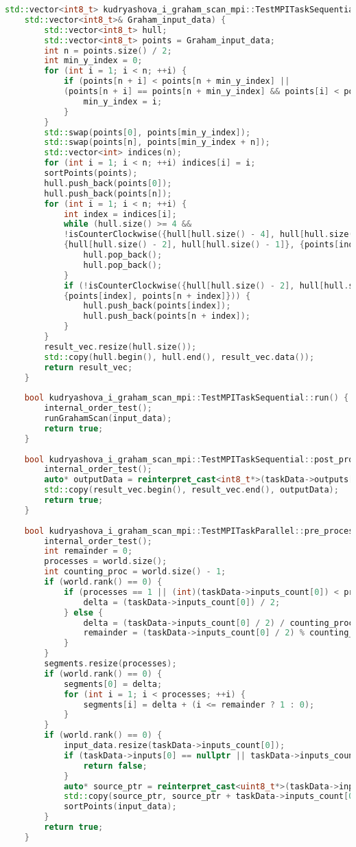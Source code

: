 \documentclass[a4paper,12pt]{article}
\begin{document}
\begin{lstlisting}[language=C++]
	std::vector<int8_t> kudryashova_i_graham_scan_mpi::TestMPITaskSequential::runGrahamScan(
	std::vector<int8_t>& Graham_input_data) {
		std::vector<int8_t> hull;
		std::vector<int8_t> points = Graham_input_data;
		int n = points.size() / 2;
		int min_y_index = 0;
		for (int i = 1; i < n; ++i) {
			if (points[n + i] < points[n + min_y_index] ||
			(points[n + i] == points[n + min_y_index] && points[i] < points[min_y_index])) {
				min_y_index = i;
			}
		}
		std::swap(points[0], points[min_y_index]);
		std::swap(points[n], points[min_y_index + n]);
		std::vector<int> indices(n);
		for (int i = 1; i < n; ++i) indices[i] = i;
		sortPoints(points);
		hull.push_back(points[0]);
		hull.push_back(points[n]);
		for (int i = 1; i < n; ++i) {
			int index = indices[i];
			while (hull.size() >= 4 &&
			!isCounterClockwise({hull[hull.size() - 4], hull[hull.size() - 3]},
			{hull[hull.size() - 2], hull[hull.size() - 1]}, {points[index], points[n + index]})) {
				hull.pop_back();
				hull.pop_back();
			}
			if (!isCounterClockwise({hull[hull.size() - 2], hull[hull.size() - 1]}, {points[index], points[n + index]},
			{points[index], points[n + index]})) {
				hull.push_back(points[index]);
				hull.push_back(points[n + index]);
			}
		}
		result_vec.resize(hull.size());
		std::copy(hull.begin(), hull.end(), result_vec.data());
		return result_vec;
	}
	
	bool kudryashova_i_graham_scan_mpi::TestMPITaskSequential::run() {
		internal_order_test();
		runGrahamScan(input_data);
		return true;
	}
	
	bool kudryashova_i_graham_scan_mpi::TestMPITaskSequential::post_processing() {
		internal_order_test();
		auto* outputData = reinterpret_cast<int8_t*>(taskData->outputs[0]);
		std::copy(result_vec.begin(), result_vec.end(), outputData);
		return true;
	}
	
	bool kudryashova_i_graham_scan_mpi::TestMPITaskParallel::pre_processing() {
		internal_order_test();
		int remainder = 0;
		processes = world.size();
		int counting_proc = world.size() - 1;
		if (world.rank() == 0) {
			if (processes == 1 || (int)(taskData->inputs_count[0]) < processes) {
				delta = (taskData->inputs_count[0]) / 2;
			} else {
				delta = (taskData->inputs_count[0] / 2) / counting_proc;
				remainder = (taskData->inputs_count[0] / 2) % counting_proc;
			}
		}
		segments.resize(processes);
		if (world.rank() == 0) {
			segments[0] = delta;
			for (int i = 1; i < processes; ++i) {
				segments[i] = delta + (i <= remainder ? 1 : 0);
			}
		}
		if (world.rank() == 0) {
			input_data.resize(taskData->inputs_count[0]);
			if (taskData->inputs[0] == nullptr || taskData->inputs_count[0] == 0) {
				return false;
			}
			auto* source_ptr = reinterpret_cast<uint8_t*>(taskData->inputs[0]);
			std::copy(source_ptr, source_ptr + taskData->inputs_count[0], input_data.begin());
			sortPoints(input_data);
		}
		return true;
	}
	

\end{lstlisting}
\end{document}
